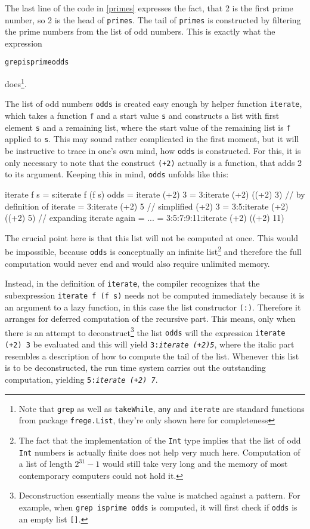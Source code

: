 \documentclass[a4paper,landscape,twocolumn]{report}
\newenvironment{code}[0]{\verbatim}{\endverbatim}
\newcommand{\ex}[1]{\begin{alltt}#1\end{alltt}}
\begin{document}
The last line of the code in \ref{primes} expresses the fact, that 2 is
the first prime number, so 2 is the head of {\tt primes}. The tail of
{\tt primes} is constructed by filtering the prime numbers from the list
of odd numbers.
This is
exactly what the expression
\ex{grep isprime odds}
does\footnote{Note that {\tt grep} as well as {\tt takeWhile},
\texttt{any}
and {\tt iterate} are
standard functions from
package {\tt frege.List}, they're only shown here for completeness}.

The list of odd numbers {\tt odds} is created easy enough by helper
function {\tt iterate}, which takes a function {\tt f} and a start value
{\tt s} and constructs a list with first element {\tt s} and a remaining
list, where the start value of the remaining list is {\tt f} applied to
{\tt s}.
This may sound rather complicated in the first moment, but it will be
instructive to trace in one's own mind, how {\tt odds} is constructed.
For this, it is only necessary to note that the construct {\tt (+2)}
actually is a function, that adds 2 to its argument. Keeping this in
mind, {\tt odds} unfolds like this:

\begin{code}
iterate f s = s:iterate f (f s)
odds = iterate (+2) 3
     = 3:iterate (+2) ((+2) 3)    // by definition of iterate
     = 3:iterate (+2) 5           // simplified (+2) 3
     = 3:5:iterate (+2) ((+2) 5)  // expanding iterate again
     = ...
     = 3:5:7:9:11:iterate (+2) ((+2) 11)
\end{code}

The crucial point here is that this list will not be computed at
once. This would be impossible, because {\tt odds} is
conceptually an infinite list\footnote{The fact that the
implementation of the {\tt Int}
type implies that the list of odd {\tt Int} numbers is actually finite
does not help very much here. Computation of a list of length $2^{31}-1$
would still
take very long and the memory of most contemporary computers could not
hold it.}
and therefore the full computation
would never end and would also require unlimited memory.

Instead, in the definition of {\tt iterate}, the compiler
recognizes that the subexpression {\tt iterate f (f s)}
needs not be computed immediately
because it is an argument to a lazy function,
in this case the list constructor {\tt (:)}.
Therefore it arranges for deferred computation of the recursive
part. This means, only when there is an attempt to
deconstruct\footnote{
Deconstruction essentially means the value
is matched against a pattern. For example, when {\tt grep
isprime odds} is computed, it will first check if {\tt odds} is
an empty list {\tt []}.}
the list {\tt odds} will the expression
{\tt iterate (+2) 3} be evaluated and this will yield
{\tt 3:{\it iterate (+2)5}}, where the italic part resembles a
description of how to
compute the tail of the list. Whenever this list is to be
deconstructed, the run time system carries out the outstanding
computation, yielding {\tt 5:{\it iterate (+2) 7}}.
\end{document}
